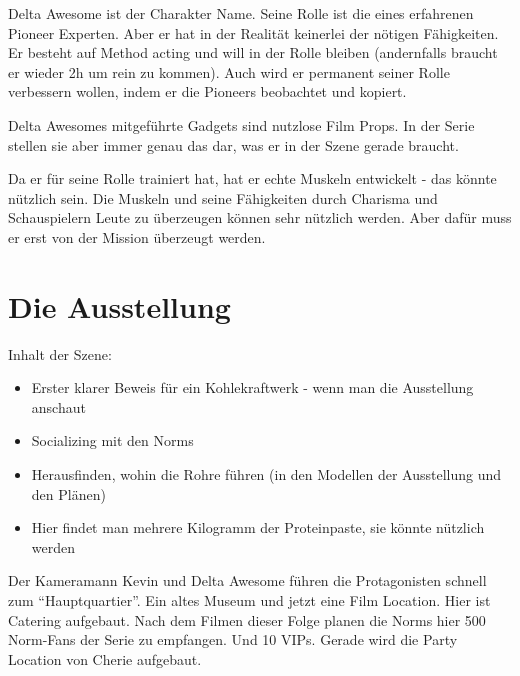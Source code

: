 \begin{npcBox}[title=Delta Awesome - spielt das Opfer]
    \begin{consequences}
    \item {}
    \item {}
    \item {}
    \end{consequences}

    \begin{npcDescription}
    Delta Awesome ist der Charakter Name. Seine Rolle ist die eines erfahrenen Pioneer Experten. Aber er hat in der Realität keinerlei der nötigen Fähigkeiten. Er besteht auf Method acting und will in der Rolle bleiben (andernfalls braucht er wieder 2h um rein zu kommen). Auch wird er permanent seiner Rolle verbessern wollen, indem er die Pioneers beobachtet und kopiert.

    Delta Awesomes mitgeführte Gadgets sind nutzlose Film Props. In der Serie stellen sie aber immer genau das dar, was er in der Szene gerade braucht.

    Da er für seine Rolle trainiert hat, hat er echte Muskeln entwickelt - das könnte nützlich sein. Die Muskeln und seine Fähigkeiten durch Charisma und Schauspielern Leute zu überzeugen können sehr nützlich werden. Aber dafür muss er erst von der Mission überzeugt werden.
    \end{npcDescription}

\end{npcBox}


\section{Die Ausstellung}

Inhalt der Szene:

\begin{itemize}
\item Erster klarer Beweis für ein Kohlekraftwerk - wenn man die Ausstellung anschaut
\item Socializing mit den Norms
\item Herausfinden, wohin die Rohre führen (in den Modellen der Ausstellung und den Plänen)
\item Hier findet man mehrere Kilogramm der Proteinpaste, sie könnte nützlich werden
\end{itemize}

Der Kameramann Kevin und Delta Awesome führen die Protagonisten schnell zum \enquote{Hauptquartier}. Ein altes Museum und jetzt eine Film Location. Hier ist Catering aufgebaut. Nach dem Filmen dieser Folge planen die Norms hier 500 Norm-Fans der Serie zu empfangen. Und 10 VIPs. Gerade wird die Party Location von Cherie aufgebaut.

